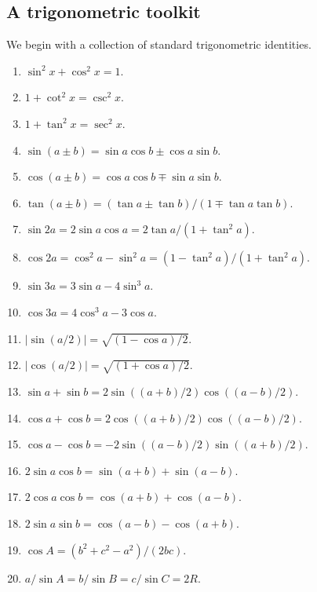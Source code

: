 \documentclass[11pt,a4paper]{article}
\begin{document}
\subsection{A trigonometric toolkit}
We begin with a collection of standard trigonometric identities.
\setcounter{theorem}{95}\begin{lemma}\label{lemma:lb1-98}
\begin{enumerate}
\setcounter{enumi}{0}\item $\sin^2x+\cos^2x=1$.
\setcounter{enumi}{1}\item $1+\cot^2x=\csc^2x$.
\setcounter{enumi}{2}\item $1+\tan^2x=\sec^2x$.
\setcounter{enumi}{3}\item $\sin(a\pm b)=\sin a\cos b\pm\cos a\sin b$.
\setcounter{enumi}{4}\item $\cos(a\pm b)=\cos a\cos b\mp\sin a\sin b$.
\setcounter{enumi}{5}\item $\tan(a\pm b)=(\tan a\pm\tan b)/(1\mp\tan a\tan b)$.
\setcounter{enumi}{6}\item $\sin2a=2\sin a\cos a=2\tan a/(1+\tan^2a)$.
\setcounter{enumi}{7}\item $\cos2a=\cos^2a-\sin^2a=(1-\tan^2a)/(1+\tan^2a)$.
\setcounter{enumi}{8}\item $\sin3a=3\sin a-4\sin^3a$.
\setcounter{enumi}{9}\item $\cos3a=4\cos^3a-3\cos a$.
\setcounter{enumi}{10}\item $|\sin(a/2)|=\sqrt{(1-\cos a)/2}$.
\setcounter{enumi}{11}\item $|\cos(a/2)|=\sqrt{(1+\cos a)/2}$.
\setcounter{enumi}{12}\item $\sin a+\sin b=2\sin((a+b)/2)\cos((a-b)/2)$.
\setcounter{enumi}{13}\item $\cos a+\cos b=2\cos((a+b)/2)\cos((a-b)/2)$.
\setcounter{enumi}{14}\item $\cos a-\cos b=-2\sin((a-b)/2)\sin((a+b)/2)$.
\setcounter{enumi}{15}\item $2\sin a\cos b=\sin(a+b)+\sin(a-b)$.
\setcounter{enumi}{16}\item $2\cos a\cos b=\cos(a+b)+\cos(a-b)$.
\setcounter{enumi}{17}\item $2\sin a\sin b=\cos(a-b)-\cos(a+b)$.
\setcounter{enumi}{18}\item $\cos A=(b^2+c^2-a^2)/(2bc)$.
\setcounter{enumi}{19}\item $a/\sin A=b/\sin B=c/\sin C=2R$.
\end{enumerate}
\end{lemma}
\end{document}
